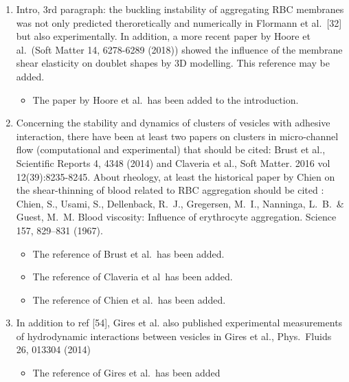 \documentclass[11pt]{article}
\newcommand{\comment}[1]{{\color{blue} #1}}
\begin{document}
\begin{enumerate}
\item\comment{Intro, 3rd paragraph: the buckling instability of aggregating RBC
membranes was not only predicted theroretically and numerically in
Flormann et al.~[32] but also experimentally. In addition, a more
recent paper by Hoore et al.~(Soft Matter 14, 6278-6289 (2018)) showed
the influence of the membrane shear elasticity on doublet shapes by 3D
modelling. This reference may be added.}
\begin{itemize}
  \item The paper by Hoore et al.~has been added to the introduction.
\end{itemize}

\item\comment{Concerning the stability and dynamics of clusters of
  vesicles with adhesive interaction, there have been at least two
    papers on clusters in micro-channel flow (computational and
    experimental) that should be cited: Brust et al., Scientific Reports
    4, 4348 (2014) and Claveria et al., Soft Matter. 2016 vol
    12(39):8235-8245. About rheology, at least the historical paper by
    Chien on the shear-thinning of blood related to RBC aggregation
    should be cited : Chien, S., Usami, S., Dellenback, R.~J.,
    Gregersen, M.~I., Nanninga, L.~B.~\& Guest, M.~M. Blood viscosity:
    Influence of erythrocyte aggregation. Science 157, 829–831 (1967).}
\begin{itemize}
  \item The reference of Brust et al.~has been added.
  \item The reference of Claveria et al~has been added.
  \item The reference of Chien et al.~has been added.
\end{itemize}

\item\comment{In addition to ref [54], Gires et al. also published experimental
measurements of hydrodynamic interactions between vesicles in Gires et
al., Phys.~Fluids 26, 013304 (2014)}
\begin{itemize}
  \item The reference of Gires et al.~has been added
\end{itemize}


\end{enumerate}
\end{document}
